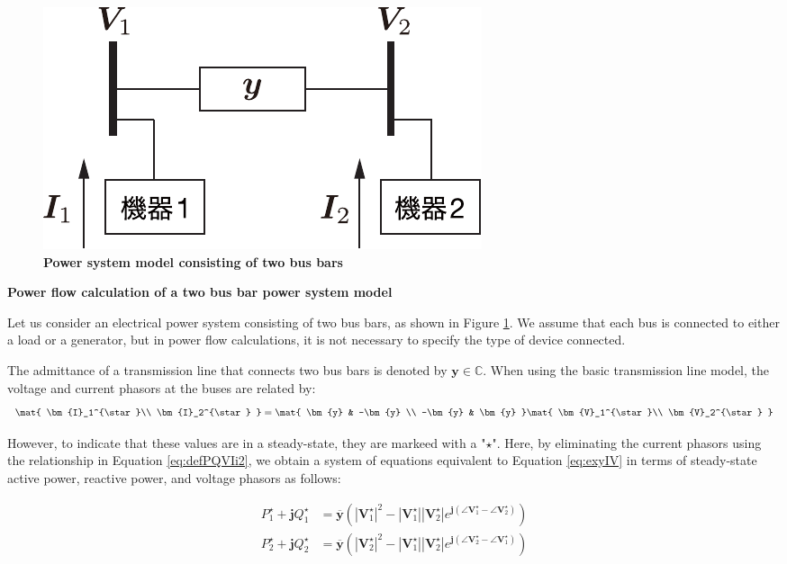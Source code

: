 \documentclass[graybox, envcountchap]{svmult}
\begin{document}
\begin{figure}[t]
\centering
\includegraphics[width = .4\linewidth]{figs/2busex}
\medskip
\caption{\textbf{Power system model consisting of two bus bars}}
\label{fig:2buspf}
\medskip
\end{figure}

\begin{example}{\textbf{Power flow calculation of a two bus bar power system
model}}\label{ex:2buspf}

Let us consider an electrical power system consisting of two bus bars, as shown
in Figure \ref{fig:2buspf}.  We assume that each bus is connected to either a
load or a generator, but in power flow calculations, it is not necessary to
specify the type of device connected.

The admittance of a transmission line that connects two bus bars is denoted by
$\bm{y}\in \mathbb{C}$. When using the basic transmission line model, the
voltage and current phasors at the buses are related by:
\begin{equation}\label{eq:exyIV}
  \mat{
    \bm{I}_1^{\star}\\
    \bm{I}_2^{\star}
  }
  =
  \mat{
    \bm{y} & -\bm{y} \\
    -\bm{y} & \bm{y}
  }
  \mat{
    \bm{V}_1^{\star}\\
    \bm{V}_2^{\star}
  }
\end{equation}

However, to indicate that these values are in a steady-state, they are markeed
with a "${\star}$". Here, by eliminating the current phasors using the
relationship in Equation \ref{eq:defPQVIi2}, we obtain a system of equations
equivalent to Equation \ref{eq:exyIV} in terms of steady-state active power,
reactive power, and voltage phasors as follows:

\begin{subequations}\label{eq:PQpf}
\begin{equation}\label{eq:PQcom}
  \begin{aligned}
    P_1^{\star} + \bm{j} Q_1^{\star} &= 
    \overline{\bm{y}} \left( 
    |\bm{V}_1^{\star}|^2 
    -  |\bm{V}_1^{\star}| |\bm{V}_2^{\star}| e^{ \bm{j} (\angle \bm{V}_1^{\star}- \angle \bm{V}_2^{\star})}
    \right) \\
    P_2^{\star} + \bm{j} Q_2^{\star} &= 
    \overline{\bm{y}} \left( 
    |\bm{V}_2^{\star}|^2
    - |\bm{V}_1^{\star}| |\bm{V}_2^{\star}| e^{ \bm{j} (\angle \bm{V}_2^{\star} - \angle \bm{V}_1^{\star})}
    \right)
  \end{aligned}
\end{equation}


\end{subequations}
\end{example}
\end{document}
